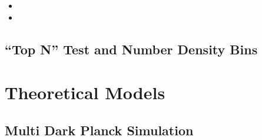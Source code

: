 \documentclass[a4paper,fleqn,usenatbib]{mnras}
\begin{document}
    
    	\begin{itemize}
		
		\item {}
		
		\item {}
		
	\end{itemize}    
	   
\subsection{``Top N'' Test and Number Density Bins}
    \label{sec:topn_intro}   


\section{Theoretical Models}
    \label{sec:model}

\subsection{Multi Dark Planck Simulation}
\end{document}
